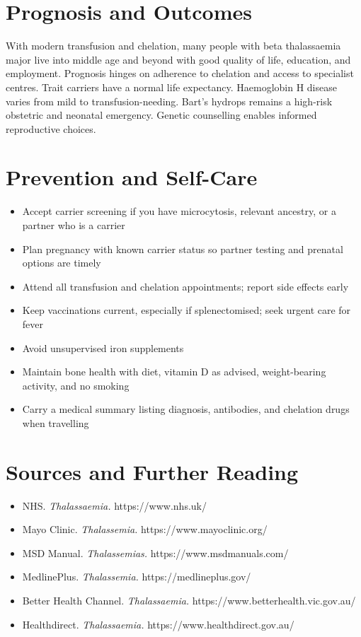 \section*{Prognosis and Outcomes}
With modern transfusion and chelation, many people with beta thalassaemia major live into middle age and beyond with good quality of life, education, and employment. Prognosis hinges on adherence to chelation and access to specialist centres. Trait carriers have a normal life expectancy. Haemoglobin H disease varies from mild to transfusion-needing. Bart's hydrops remains a high-risk obstetric and neonatal emergency. Genetic counselling enables informed reproductive choices.

\section*{Prevention and Self-Care}
\begin{itemize}
    \item Accept carrier screening if you have microcytosis, relevant ancestry, or a partner who is a carrier
    \item Plan pregnancy with known carrier status so partner testing and prenatal options are timely
    \item Attend all transfusion and chelation appointments; report side effects early
    \item Keep vaccinations current, especially if splenectomised; seek urgent care for fever
    \item Avoid unsupervised iron supplements
    \item Maintain bone health with diet, vitamin D as advised, weight-bearing activity, and no smoking
    \item Carry a medical summary listing diagnosis, antibodies, and chelation drugs when travelling
\end{itemize}

\section*{Sources and Further Reading}
\begin{itemize}
    \item NHS. \textit{Thalassaemia.} https://www.nhs.uk/
    \item Mayo Clinic. \textit{Thalassemia.} https://www.mayoclinic.org/
    \item MSD Manual. \textit{Thalassemias.} https://www.msdmanuals.com/
    \item MedlinePlus. \textit{Thalassemia.} https://medlineplus.gov/
    \item Better Health Channel. \textit{Thalassaemia.} https://www.betterhealth.vic.gov.au/
    \item Healthdirect. \textit{Thalassaemia.} https://www.healthdirect.gov.au/
\end{itemize}
